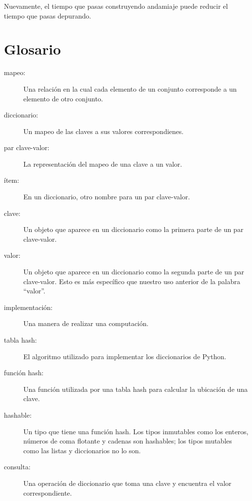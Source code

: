 \documentclass[10pt]{book}
\begin{document}
Nuevamente, el tiempo que pasas construyendo andamiaje puede reducir
el tiempo que pasas depurando.


\section{Glosario}

\begin{description}

\item[mapeo:] Una relación en la cual cada elemento de un conjunto
corresponde a un elemento de otro conjunto.

\item[diccionario:] Un mapeo de las claves a sus
valores correspondienes.

\item[par clave-valor:] La representación del mapeo de
una clave a un valor.

\item[ítem:] En un diccionario, otro nombre para un par
clave-valor.

\item[clave:] Un objeto que aparece en un diccionario como la
primera parte de un par clave-valor.

\item[valor:] Un objeto que aparece en un diccionario como la
segunda parte de un par clave-valor.  Esto es más específico que
nuestro uso anterior de la palabra ``valor''.

\item[implementación:] Una manera de realizar una computación.

\item[tabla hash:] El algoritmo utilizado para implementar los
diccionarios de Python.

\item[función hash:] Una función utilizada por una tabla hash para calcular
la ubicación de una clave.

\item[hashable:] Un tipo que tiene una función hash.  Los tipos inmutables
como los enteros, números de
coma flotante y cadenas son hashables; los tipos mutables como las listas y
diccionarios no lo son.

\item[consulta:] Una operación de diccionario que toma una clave y encuentra
el valor correspondiente.


\end{description}
\end{document}
